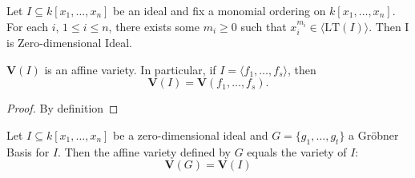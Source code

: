 \begin{lemma}\label{verify_zero_dim_ideal}
  Let \( I \subseteq k[x_1, \ldots, x_n] \) be an ideal and fix a monomial ordering on \( k[x_1, \ldots, x_n] \). For each \( i \), \( 1 \leq i \leq n \), there exists some \( m_i \geq 0 \) such that \( x_i^{m_i} \in \langle \mathrm{LT}(I)\rangle \). Then I is Zero-dimensional Ideal.
\end{lemma}

\begin{lemma}\label{V_I_equal_V_F}
  \( \mathbf{V}(I) \) is an affine variety. In particular, if \( I = \langle f_1, \ldots, f_s \rangle \), then
  \[
  \mathbf{V}(I) = \mathbf{V}(f_1, \ldots, f_s).
  \]
\end{lemma}
\begin{proof}
  By definition
\end{proof}

\begin{lemma}\label{V_G_equal_V_I}
  Let $I \subseteq k[x_1,\ldots,x_n]$ be a zero-dimensional ideal and $G = \{g_1,\ldots,g_t\}$ a Gröbner Basis for $I$. Then the affine variety defined by $G$ equals the variety of $I$:
  \[
  \mathbf{V}(G) = \mathbf{V}(I)
  \]
\end{lemma}
